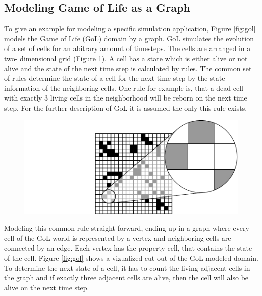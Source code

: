 \subsection{Modeling Game of Life as a Graph}
\label{sec:gol}
To give an example for modeling a specific simulation application,
Figure \ref{fig:gol} models the Game of Life (GoL) \cite{ref:gol}
domain by a graph. GoL simulates the evolution of a set of cells for
an abitrary amount of timesteps. The cells are arranged in a two-
dimensional grid (Figure \ref{fig:gol_simulation}).  A cell has a
state which is either alive or not alive and the state of the next
time step is calculated by rules. The common set of rules determine
the state of a cell for the next time step by the state information of
the neighboring cells. One rule for example is, that a dead cell with
exactly 3 living cells in the neighborhood will be reborn on the next
time step. For the further description of GoL it is assumed the only
this rule exists.

\begin{figure}[H]
  \centering \includegraphics[width=\textwidth]{graphics/30_gol_simulation}
  \caption{}
  \label{fig:gol_simulation}
\end{figure}

Modeling this common rule straight forward, ending up in a graph where
every cell of the GoL world is represented by a vertex and neighboring
cells are connected by an edge. Each vertex has the property cell, that
contains the state of the cell. Figure \ref{fig:gol} shows a vizualized
cut out of the GoL modeled domain. To determine the next state of a 
cell, it has to count the living adjacent cells in the graph and if
exactly three adjacent cells are alive, then the cell will also be
alive on the next time step.

